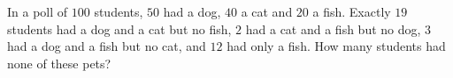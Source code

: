 In a poll of $100$ students, $50$ had a dog, $40$ a cat and $20$ a fish. Exactly $19$ students had a dog and a cat but no fish, $2$ had a cat and a fish but no dog, $3$ had a dog and a fish but no cat, and $12$ had only a fish. How many students had none of these pets?
